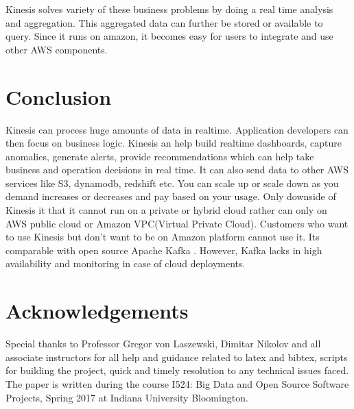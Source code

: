 \documentclass[9pt,twocolumn,twoside]{../../styles/osajnl}
\begin{document}
Kinesis solves variety of these business problems by doing a real time analysis and aggregation. This aggregated data can further be stored or available to query. Since it runs on amazon, it becomes easy for users to integrate and use other AWS components.

\section{Conclusion}
Kinesis can process huge amounts of data in realtime. Application developers can then focus on business logic. Kinesis \cite{varia2014overview} an help build realtime dashboards, capture anomalies, generate alerts, provide recommendations which can help take business and operation decisions in real time. It can also send data to other AWS services like S3, dynamodb, redshift etc. You can scale up or scale down as you demand increases or decreases and pay based on your usage. Only downside of Kinesis it that it cannot run on a private or hybrid cloud rather can only on AWS public cloud or Amazon VPC(Virtual Private Cloud). Customers who want to use Kinesis but don't want to be on Amazon platform cannot use it. Its comparable with open source Apache Kafka\cite{deyhim2016kafka} . However, Kafka lacks in high availability and monitoring in case of cloud deployments. 

\section*{Acknowledgements}
Special thanks to Professor Gregor von Laszewski, Dimitar Nikolov and all associate instructors for all help and guidance related to latex and bibtex, scripts for building the project, quick and timely resolution to any technical issues faced. The paper is written during the course  {I524: Big Data and Open Source Software Projects, Spring 2017} at Indiana University Bloomington.

 
\medskip

% 

\end{document}
